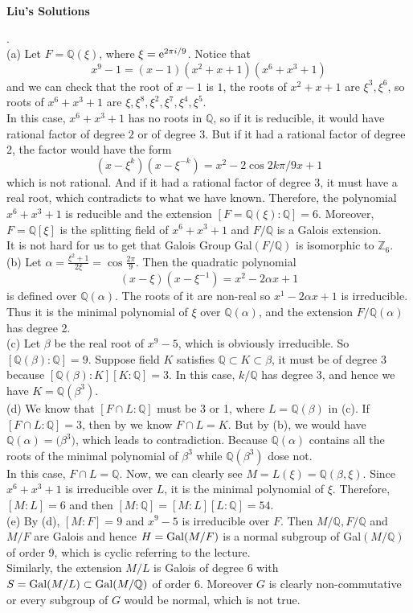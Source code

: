 \documentclass[11pt,a4paper]{ctexart}
\begin{document}
\begin{center}
\Large\textbf{Liu's Solutions}
\end{center}
.\\
(a) Let $F=\mathbb{Q}(\xi)$, where $\xi=\textup{e}^{2\pi i/9}$. Notice that
$$x^9-1=(x-1)(x^2+x+1)(x^6+x^3+1)$$
and we can check that the root of $x-1$ is $1$, the roots of $x^2+x+1$ are $\xi^3,\xi^6$, so roots of $x^6+x^3+1$ are $\xi,\xi^8,\xi^2,\xi^7,\xi^4,\xi^5$.\\
In this case, $x^6+x^3+1$ has no roots in $\mathbb{Q}$, so if it is reducible, it would have rational factor of degree $2$ or of degree $3$. But if it had a rational factor of degree 2, the factor would have the form
$$(x-\xi^k)(x-\xi^{-k})=x^2-2\cos{2k\pi/9}x+1$$
which is not rational. And if it had a rational factor of degree 3, it must have a real root, which contradicts to what we have known. Therefore, the polynomial $x^6+x^3+1$ is reducible and the extension $[F=\mathbb{Q}(\xi):\mathbb{Q}]=6$. Moreover, $F=\mathbb{Q}[\xi]$ is the splitting field of $x^6+x^3+1$ and $F/\mathbb{Q}$ is a Galois extension.\\
It is not hard for us to get that Galois Group Gal$(F/\mathbb{Q})$ is isomorphic to $\mathbb{Z}_6$.\\
(b) Let $\alpha=\frac{\xi^2+1}{2\xi}=\cos{\frac{2\pi}{9}}$. Then the quadratic polynomial
$$(x-\xi)(x-\xi^{-1})=x^2-2\alpha x+1$$
is defined over $\mathbb{Q}(\alpha)$. The roots of it are non-real so $x^1-2\alpha x+1$ is irreducible. Thus it is the minimal polynomial of $\xi$ over $\mathbb{Q}(\alpha)$, and the extension $F/\mathbb{Q}(\alpha)$ has degree 2.\\
(c) Let $\beta$ be the real root of $x^9-5$, which is obviously irreducible. So $[\mathbb{Q}(\beta):\mathbb{Q}]=9$. Suppose field $K$ satisfies $\mathbb{Q}\subset K\subset\mathbb{\beta}$, it must be of degree 3 because $[\mathbb{Q}(\beta):K][K:\mathbb{Q}]=3$. In this case, $k/\mathbb{Q}$ has degree 3, and hence we have $K=\mathbb{Q}(\beta^3)$.\\
(d) We know that $[F\cap L:\mathbb{Q}]$ must be 3 or 1, where $L=\mathbb{Q}(\beta)$ in (c). If $[F\cap L:\mathbb{Q}]=3$, then by we know $F\cap L=K$. But by (b), we would have $\mathbb{Q}(\alpha)=\mathbb(\beta^3)$, which leads to contradiction. Because $\mathbb{Q}(\alpha)$ contains all the roots of the minimal polynomial of $\beta^3$ while $\mathbb{Q}(\beta^3)$ dose not.\\
In this case, $F\cap L=\mathbb{Q}$. Now, we can clearly see $M=L(\xi)=\mathbb{Q}(\beta,\xi)$. Since $x^6+x^3+1$ is irreducible over $L$, it is the minimal polynomial of $\xi$. Therefore, $[M:L]=6$ and then $[M:\mathbb{Q}]=[M:L][L:\mathbb{Q}]=54$.\\
(e) By (d), $[M:F]=9$ and $x^9-5$ is irreducible over $F$. Then $M/\mathbb{Q},F/\mathbb{Q}$ and $M/F$ are Galois and hence $H=\textup{Gal}(M/F)$ is a normal subgroup of Gal$(M/\mathbb{Q})$ of order 9, which is cyclic referring to the lecture.\\
Similarly, the extension $M/L$ is Galois of degree 6 with $S=\textup{Gal}(M/L)\subset\textup{Gal}(M/\mathbb{Q})$ of order 6.
Moreover $G$ is clearly non-commutative or every subgroup of $G$ would be normal, which is not true.
\end{document}
